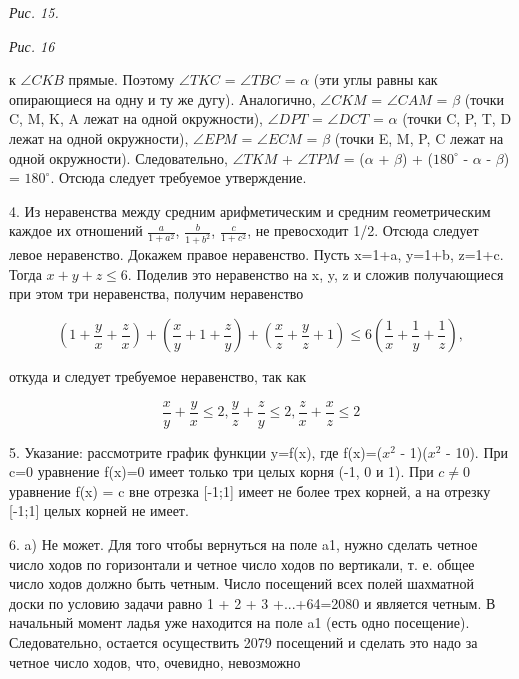 \textit{Рис. 15.}



\begin{figure}[h]
    \noindent{}
\end{figure}
\textit{Рис. 16}
\vspace*{8pt}

к $\angle CKB$ прямые. Поэтому $\angle TKC$ = $\angle TBC$ = $\alpha$ (эти углы равны как опирающиеся на одну и ту же дугу). Аналогично, $\angle CKM$ = $\angle CAM$ = $\beta$ (точки C, M, K, A лежат на одной окружности), $\angle DPT$ = $\angle DCT$ = $\alpha$ (точки C, P, T, D лежат на одной окружности), $\angle EPM$ = $\angle ECM$ = $\beta$ (точки E, M, P, C лежат на одной окружности). Следовательно, $\angle TKM$ + $\angle TPM$ = ($\alpha$ + $\beta$) + ($180^{\circ}$ - $\alpha$ - $\beta$) = $180^{\circ}$. Отсюда следует требуемое утверждение.

4. Из неравенства между средним арифметическим и средним геометрическим каждое их отношений {\large $\frac{a}{1+a^2}$, $\frac{b}{1+b^2}$, $\frac{c}{1+c^2}$}, не превосходит 1/2. Отсюда следует левое неравенство. Докажем правое неравенство. Пусть x=1+a, y=1+b, z=1+c. Тогда $x + y + z \leq 6$. Поделив это неравенство на x, y, z и сложив получающиеся при этом три неравенства, получим неравенство

\[
(1 + \frac{y}{x} + \frac{z}{x}) + (\frac{x}{y} + 1 + \frac{z}{y}) + (\frac{x}{z} + \frac{y}{z} + 1) \leq 6(\frac{1}{x} + \frac{1}{y} + \frac{1}{z}),
\]

откуда и следует требуемое неравенство, так как

\[
    \frac{x}{y} + \frac{y}{x} \leq 2, \frac{y}{z} + \frac{z}{y} \leq 2, \frac{z}{x} + \frac{x}{z} \leq 2
\]

5. Указание: рассмотрите график функции y=f(x), где f(x)=($x^2$ - 1)($x^2$ - 10). При c=0 уравнение f(x)=0 имеет только три целых корня (-1, 0 и 1). При $c \neq 0$ уравнение f(x) = c вне отрезка [-1;1] имеет не более трех корней, а на отрезку [-1;1] целых корней не имеет.

6. a) Не может. Для того чтобы вернуться на поле a1, нужно сделать четное число ходов по горизонтали и четное число ходов по вертикали, т. е. общее число ходов должно быть четным. Число посещений всех полей шахматной доски по условию задачи равно 1 + 2 + 3 +...+64=2080 и является четным. В начальный момент ладья уже находится на поле a1 (есть одно посещение). Следовательно, остается осуществить 2079 посещений и сделать это надо за четное число ходов, что, очевидно, невозможно
